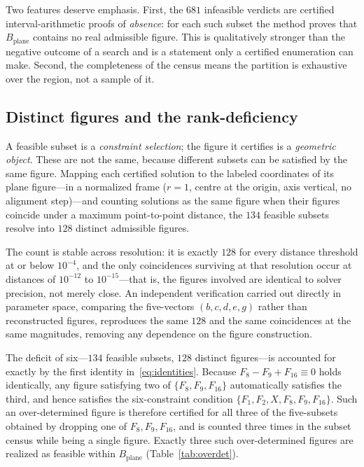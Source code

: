 \documentclass[11pt]{article}
\newcommand{\Bplane}{B_{\mathrm{plane}}}
\begin{document}
Two features deserve emphasis. First, the $681$ infeasible verdicts are certified interval-arithmetic proofs of \emph{absence}: for each such subset the method proves that $\Bplane$ contains no real admissible figure. This is qualitatively stronger than the negative outcome of a search and is a statement only a certified enumeration can make. Second, the completeness of the census means the partition is exhaustive over the region, not a sample of it.

\subsection{Distinct figures and the rank-deficiency}
\label{sec:distinct}

A feasible subset is a \emph{constraint selection}; the figure it certifies is a \emph{geometric object}. These are not the same, because different subsets can be satisfied by the same figure. Mapping each certified solution to the labeled coordinates of its plane figure---in a normalized frame ($r=1$, centre at the origin, axis vertical, no alignment step)---and counting solutions as the same figure when their figures coincide under a maximum point-to-point distance, the $134$ feasible subsets resolve into $128$ distinct admissible figures.

The count is stable across resolution: it is exactly $128$ for every distance threshold at or below $10^{-4}$, and the only coincidences surviving at that resolution occur at distances of $10^{-12}$ to $10^{-15}$---that is, the figures involved are identical to solver precision, not merely close. An independent verification carried out directly in parameter space, comparing the five-vectors $(b,c,d,e,g)$ rather than reconstructed figures, reproduces the same $128$ and the same coincidences at the same magnitudes, removing any dependence on the figure construction.

The deficit of six---$134$ feasible subsets, $128$ distinct figures---is accounted for exactly by the first identity in~\eqref{eq:identities}. Because $F_8-F_9+F_{16}\equiv0$ holds identically, any figure satisfying two of $\{F_8,F_9,F_{16}\}$ automatically satisfies the third, and hence satisfies the six-constraint condition $\{F_1,F_2,X,F_8,F_9,F_{16}\}$. Such an over-determined figure is therefore certified for all three of the five-subsets obtained by dropping one of $F_8,F_9,F_{16}$, and is counted three times in the subset census while being a single figure. Exactly three such over-determined figures are realized as feasible within $\Bplane$ (Table~\ref{tab:overdet}).
\end{document}
